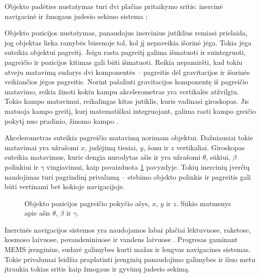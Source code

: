 Objekto padėties nustatymas turi dvi plačias pritaikymo sritis: inercinė navigacinė ir žmogaus judesio sekimo sistema \cite{schlomer2008gesture};

Objekto pozicijos nustatymas, panaudojus inercinius jutiklius remiasi prielaida, jog objektas lieka ramybės būsenoje tol, kol jį nepaveikia išorinė jėga. Tokia jėga suteikia objektui pagreitį. Jeigu rasta pagreitį galima išmatuoti ir suintegruoti, pagreičio ir pozicijos kitimas gali būti išmatuoti. Reikia nepamiršti, kad tokiu atveju matavimą sudarys dvi komponentės -- pagreitis dėl gravitacijos ir išorinės veikiančios jėgos pagreitis. Norint pašalinti gravitacijos komponentę iš pagreičio matavimo, reikia žinoti kokiu kampu akcelerometras yra vertikalės atžvilgiu.
Tokio kampo matavimui, reikalingas kitas jutiklis, kuris vadinasi giroskopas. Jis matuoja kampo greitį, kurį matematiškai integruojant, galima rasti kampo greičio pokytį nuo pradinio, žinomo kampo \cite{sukkarieh2000low}.

Akcelerometras suteikia pagreičio matavimą norimam objektui. Dažniausiai tokie matavimai yra užrašomi $x$, judėjimą tiesiai, $y$, šonu ir $z$ vertikaliai. Giroskopas suteikia matavimus, kurie dengia nurodytas ašis ir yra užrašomi $\theta$, sūkiui, $\beta$ polinkiui ir $\gamma$ vingiavimui, kaip pavaizduota \ref{tikz:axis_of_the_system} pavyzdyje. Tokių inercinių įverčių naudojimas turi pagrindinį privalumą -- stebimo objekto polinkis ir pagreitis gali būti vertinami bet kokioje navigacijoje.  

\begin{figure}[H]
    \centering
    \caption{Objekto pozicijos pagreičio pokyčio ašys, $x$, $y$ ir $z$. Sūkio matmenys apie ašis $\theta$, $\beta$ ir $\gamma$.}
    \label{tikz:axis_of_the_system}
\end{figure}

Inercinės navigacijos sistemos yra naudojamos labai plačiai lėktuvuose, raketose, kosmoso laivuose, povandeniniuose ir vandens laivuose \cite{woodman2007introduction}. Progresas gaminant MEMS įrenginius, sudarė galimybes kurti mažas ir lengvas navigacines sistemas. Tokie privalumai leidžia praplatinti įrenginių panaudojimo galimybes ir šiuo metu įtraukia tokias sritis kaip žmogaus ir gyvūnų judesio sekimą.

